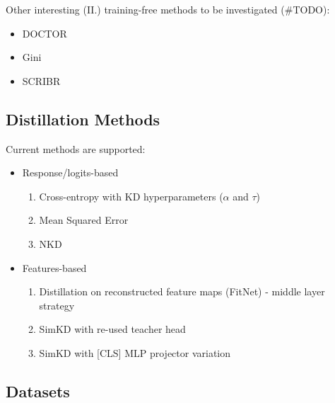 Other interesting (II.) training-free methods to be investigated (\#TODO): 
\begin{itemize}
    \item DOCTOR \cite{granese2021doctor}
    \item Gini \cite{gomes2023a}
    \item SCRIBR \cite{lin2022scrib}
\end{itemize}

\subsection{Distillation Methods}

Current \KD{} methods are supported: 
\begin{itemize}
\item  Response/logits-based
\begin{enumerate}
    \item Cross-entropy with KD hyperparameters ($\alpha$ and $\tau$) \cite{hinton2015distilling}
    \item Mean Squared Error \cite{kim2021comparing}
    \item NKD \cite{yang2023knowledge}
\end{enumerate}
\item  Features-based
\begin{enumerate}
    \item Distillation on reconstructed feature maps (FitNet) - middle layer strategy \cite{romero2014fitnets}
    \item SimKD with re-used teacher head \cite{SimKD} %
    \item SimKD with [CLS] MLP projector variation
\end{enumerate}
\end{itemize}



\subsection{Datasets}

